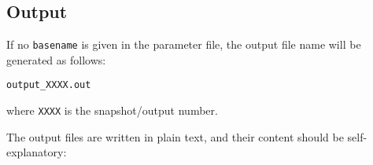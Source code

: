 \subsection{Output}




If no \texttt{basename} is given in the parameter file, the output file
name will be generated as follows:

\begin{lstlisting}
output_XXXX.out
\end{lstlisting}

where \texttt{XXXX} is the snapshot/output number.


The output files are written in plain text, and their content should be
self-explanatory:

